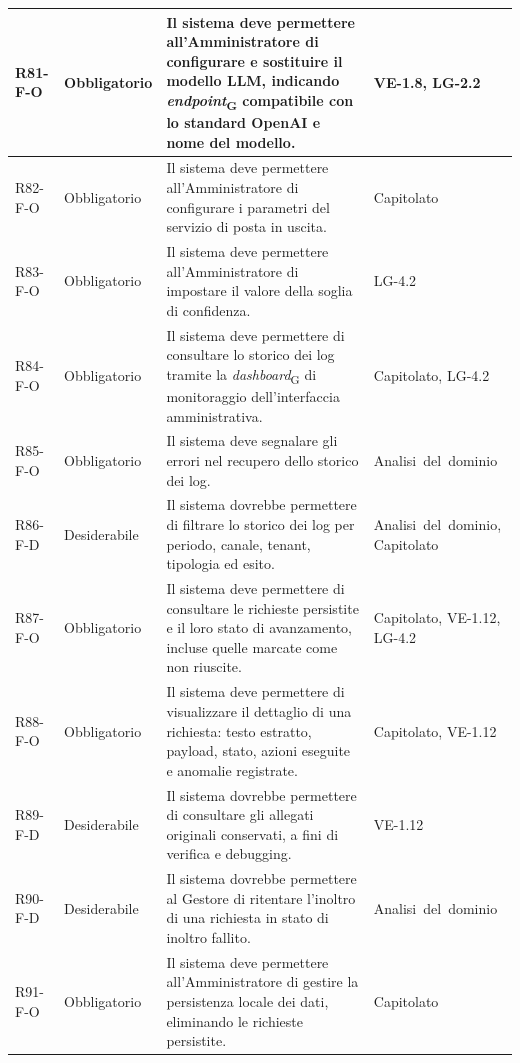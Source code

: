 {\begin{longtable}{|>{\raggedright\arraybackslash}p{1.8cm}|>{\raggedright\arraybackslash}p{2.3cm}|>{\raggedright\arraybackslash}p{6.6cm}|>{\raggedright\arraybackslash}p{3.1cm}|}
    \mbox{R81-F-O} & Obbligatorio & Il sistema deve permettere all'Amministratore di configurare e sostituire il modello LLM, indicando \textit{endpoint}\textsubscript{G} compatibile con lo standard OpenAI e nome del modello. & \mbox{VE-1.8}, \mbox{LG-2.2} \\ \hline
    \mbox{R82-F-O} & Obbligatorio & Il sistema deve permettere all'Amministratore di configurare i parametri del servizio di posta in uscita. & \mbox{Capitolato} \\ \hline
    \mbox{R83-F-O} & Obbligatorio & Il sistema deve permettere all'Amministratore di impostare il valore della soglia di confidenza. & \mbox{LG-4.2} \\ \hline
    \mbox{R84-F-O} & Obbligatorio & Il sistema deve permettere di consultare lo storico dei log tramite la \textit{dashboard}\textsubscript{G} di monitoraggio dell'interfaccia amministrativa. & \mbox{Capitolato}, \mbox{LG-4.2} \\ \hline
    \mbox{R85-F-O} & Obbligatorio & Il sistema deve segnalare gli errori nel recupero dello storico dei log. & \mbox{Analisi del dominio} \\ \hline
    \mbox{R86-F-D} & Desiderabile & Il sistema dovrebbe permettere di filtrare lo storico dei log per periodo, canale, tenant, tipologia ed esito. & \mbox{Analisi del dominio}, \mbox{Capitolato} \\ \hline
    \mbox{R87-F-O} & Obbligatorio & Il sistema deve permettere di consultare le richieste persistite e il loro stato di avanzamento, incluse quelle marcate come non riuscite. & \mbox{Capitolato}, \mbox{VE-1.12}, \mbox{LG-4.2} \\ \hline
    \mbox{R88-F-O} & Obbligatorio & Il sistema deve permettere di visualizzare il dettaglio di una richiesta: testo estratto, payload, stato, azioni eseguite e anomalie registrate. & \mbox{Capitolato}, \mbox{VE-1.12} \\ \hline
    \mbox{R89-F-D} & Desiderabile & Il sistema dovrebbe permettere di consultare gli allegati originali conservati, a fini di verifica e debugging. & \mbox{VE-1.12} \\ \hline
    \mbox{R90-F-D} & Desiderabile & Il sistema dovrebbe permettere al Gestore di ritentare l'inoltro di una richiesta in stato di inoltro fallito. & \mbox{Analisi del dominio} \\ \hline
    \mbox{R91-F-O} & Obbligatorio & Il sistema deve permettere all'Amministratore di gestire la persistenza locale dei dati, eliminando le richieste persistite. & \mbox{Capitolato} \\ \hline

\end{longtable}}
